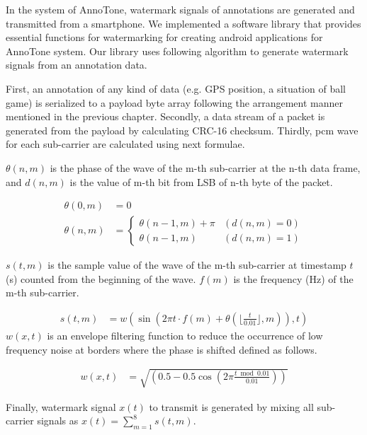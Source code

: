 In the system of AnnoTone, watermark signals of annotations are generated and transmitted from a smartphone.
We implemented a software library that provides essential functions for watermarking for creating android applications for AnnoTone system.
Our library uses following algorithm to generate watermark signals from an annotation data.

First, an annotation of any kind of data (e.g. GPS position, a situation of ball game) is serialized to a payload byte array following the arrangement manner mentioned in the previous chapter.
Secondly, a data stream of a packet is generated from the payload by calculating CRC-16 checksum.
Thirdly, pcm wave for each sub-carrier are calculated using next formulae.

$\theta(n, m)$ is the phase of the wave of the m-th sub-carrier at the n-th data frame, and $d(n, m)$ is the value of m-th bit from LSB of n-th byte of the packet.

\begin{align}
\theta(0, m) &= 0 \\
\theta(n, m) &= \begin{cases}
	\theta(n-1, m) + \pi & (d(n, m) = 0) \\
	\theta(n-1, m) & (d(n, m) = 1)
\end{cases}
\end{align}

$s(t, m)$ is the sample value of the wave of the m-th sub-carrier at timestamp $t$ (s) counted from the beginning of the wave. $f(m)$ is the frequency (Hz) of the m-th sub-carrier.

\begin{align}
s(t, m) &= w( \sin{(2 \pi t \cdot f(m) + \theta(\lfloor \frac{t}{0.01} \rfloor, m))}, t)
\end{align}
$w(x, t)$ is an envelope filtering function to reduce the occurrence of low frequency noise at borders where the phase is shifted defined as follows.

\begin{align}
w(x, t) &= \sqrt{(0.5 - 0.5\cos{( 2 \pi \frac{t \bmod 0.01}{0.01} )})}
\end{align}

Finally, watermark signal $x(t)$ to transmit is generated by mixing all sub-carrier signals as $ x(t) = \sum^{8}_{m=1} s(t, m)$.
